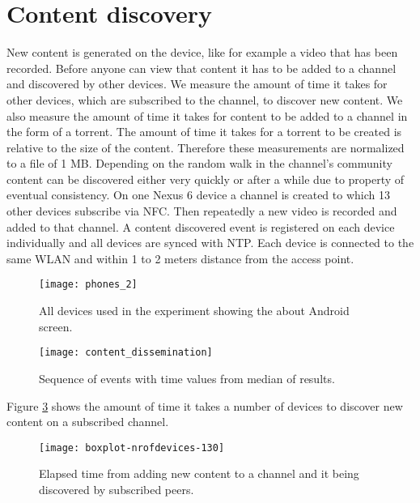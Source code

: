 \section{Content discovery}
New content is generated on the device, like for example a video that has been recorded.
Before anyone can view that content it has to be added to a channel and discovered by other devices.
We measure the amount of time it takes for other devices, which are subscribed to the channel, to discover new content.
We also measure the amount of time it takes for content to be added to a channel in the form of a torrent.
The amount of time it takes for a torrent to be created is relative to the size of the content.
Therefore these measurements are normalized to a file of 1 MB.
Depending on the random walk in the channel's community content can be discovered either very quickly or after a while due to property of eventual consistency.
On one Nexus 6 device a channel is created to which 13 other devices subscribe via NFC.
Then repeatedly a new video is recorded and added to that channel.
A content discovered event is registered on each device individually and all devices are synced with NTP.
Each device is connected to the same WLAN and within 1 to 2 meters distance from the access point.
\begin{figure}[H]
	\centering
	\texttt{[image: phones\_2]}
	\caption{All devices used in the experiment showing the about Android screen.}
	\label{fig:phones_2}
\end{figure}
\begin{figure}[H]
	\centering
	\texttt{[image: content\_dissemination]}
	\caption{Sequence of events with time values from median of results.}
	\label{fig:content_dissemination}
\end{figure}
Figure \ref{fig:boxplot-nr.of.devices-130} shows the amount of time it takes a number of devices to discover new content on a subscribed channel.
\begin{figure}[H]
	\centering %
	\texttt{[image: boxplot-nrofdevices-130]}
	\caption{Elapsed time from adding new content to a channel and it being discovered by subscribed peers.}
	\label{fig:boxplot-nr.of.devices-130}
\end{figure}
